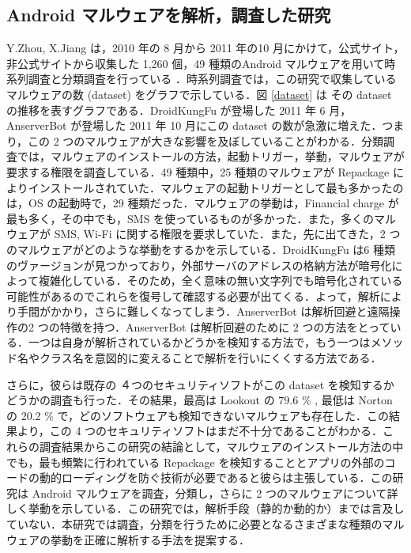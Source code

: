 \subsection{Android マルウェアを解析，調査した研究}
\label{researches}
Y.Zhou, X.Jiang は，2010 年の 8 月から 2011 年の10 月にかけて，公式サイト，非公式サイトから収集した 1,260 個，49 種類のAndroid マルウェアを用いて時系列調査と分類調査を行っている \cite{dissect} ．時系列調査では，この研究で収集しているマルウェアの数 (dataset) をグラフで示している．図 \ref{dataset} は その dataset の推移を表すグラフである．DroidKungFu が登場した 2011 年 6 月，AnserverBot が登場した 2011 年 10 月にこの dataset の数が急激に増えた．つまり，この 2 つのマルウェアが大きな影響を及ぼしていることがわかる．分類調査では，マルウェアのインストールの方法，起動トリガー，挙動，マルウェアが要求する権限を調査している．49 種類中，25 種類のマルウェアが Repackage によりインストールされていた．マルウェアの起動トリガーとして最も多かったのは，OS の起動時で，29 種類だった．マルウェアの挙動は，Financial charge が最も多く，その中でも，SMS を使っているものが多かった．また，多くのマルウェアが SMS, Wi-Fi に関する権限を要求していた．また，先に出てきた，2 つのマルウェアがどのような挙動をするかを示している．DroidKungFu は6 種類のヴァージョンが見つかっており，外部サーバのアドレスの格納方法が暗号化によって複雑化している．そのため，全く意味の無い文字列でも暗号化されている可能性があるのでこれらを復号して確認する必要が出てくる．よって，解析により手間がかかり，さらに難しくなってしまう．AnserverBot は解析回避と遠隔操作の2 つの特徴を持つ．AnserverBot は解析回避のために 2 つの方法をとっている．一つは自身が解析されているかどうかを検知する方法で，もう一つはメソッド名やクラス名を意図的に変えることで解析を行いにくくする方法である．

さらに，彼らは既存の ４つのセキュリティソフトがこの  dataset を検知するかどうかの調査も行った．その結果，最高は Lookout の 79.6 \% , 最低は Norton の 20.2 \% で，どのソフトウェアも検知できないマルウェアも存在した．この結果より，この 4 つのセキュリティソフトはまだ不十分であることがわかる．これらの調査結果からこの研究の結論として，マルウェアのインストール方法の中でも，最も頻繁に行われている Repackage を検知することとアプリの外部のコードの動的ローディングを防ぐ技術が必要であると彼らは主張している．この研究は Android マルウェアを調査，分類し，さらに 2 つのマルウェアについて詳しく挙動を示している．この研究では，解析手段（静的か動的か）までは言及していない．本研究では調査，分類を行うために必要となるさまざまな種類のマルウェアの挙動を正確に解析する手法を提案する．


